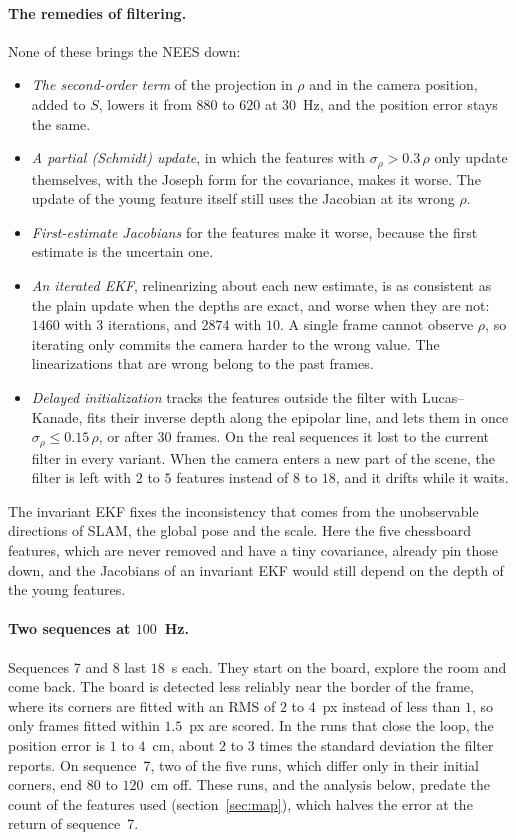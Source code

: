 \documentclass[11pt]{article}
\begin{document}
\paragraph{The remedies of filtering.}
None of these brings the NEES down:
\begin{itemize}
  \item \emph{The second-order term} of the projection in $\rho$ and in the camera position, added
        to $S$, lowers it from $880$ to $620$ at $30$~Hz, and the position error stays the same.
  \item \emph{A partial (Schmidt) update}, in which the features with $\sigma_\rho > 0.3\, \rho$ only
        update themselves, with the Joseph form for the covariance, makes it worse. The update
        of the young feature itself still uses the Jacobian at its wrong $\rho$.
  \item \emph{First-estimate Jacobians} for the features make it worse, because the first estimate
        is the uncertain one.
  \item \emph{An iterated EKF}, relinearizing about each new estimate, is as consistent as the plain
        update when the depths are exact, and worse when they are not: $1460$ with $3$ iterations,
        and $2874$ with $10$. A single frame cannot observe $\rho$, so iterating only commits the
        camera harder to the wrong value. The linearizations that are wrong belong to the past
        frames.
  \item \emph{Delayed initialization} tracks the features outside the filter with Lucas--Kanade,
        fits their inverse depth along the epipolar line, and lets them in once
        $\sigma_\rho \le 0.15\, \rho$, or after $30$ frames. On the real sequences it lost to the
        current filter in every variant. When the camera enters a new part of the scene, the filter
        is left with $2$ to $5$ features instead of $8$ to $18$, and it drifts while it waits.
\end{itemize}
The invariant EKF fixes the inconsistency that comes from the unobservable directions of SLAM, the
global pose and the scale. Here the five chessboard features, which are never removed and have a
tiny covariance, already pin those down, and the Jacobians of an invariant EKF would still depend
on the depth of the young features.

\paragraph{Two sequences at $100$~Hz.}
Sequences 7 and 8 last $18$~s each. They start on the board, explore the room and come back. The
board is detected less reliably near the border of the frame, where its corners are fitted with an
RMS of $2$ to $4$~px instead of less than $1$, so only frames fitted within $1.5$~px are scored. In
the runs that close the loop, the position error is $1$ to $4$~cm, about $2$ to $3$ times the
standard deviation the filter reports. On sequence~7, two of the five runs, which differ only in
their initial corners, end $80$ to $120$~cm off. These runs, and the analysis below, predate the
count of the features used (section~\ref{sec:map}), which halves the error at the return of
sequence~7.
\end{document}
